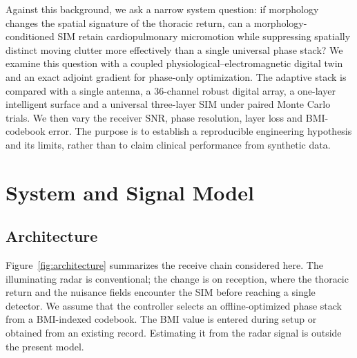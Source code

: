 \documentclass[pdflatex,sn-nature]{sn-jnl}
\begin{document}
Against this background, we ask a narrow system question: if morphology changes the
spatial signature of the thoracic return, can a morphology-conditioned SIM retain
cardiopulmonary micromotion while suppressing spatially distinct moving clutter more
effectively than a single universal phase stack? We examine this question with a
coupled physiological--electromagnetic digital twin and an exact adjoint gradient for
phase-only optimization. The adaptive stack is compared with a single antenna, a
36-channel robust digital array, a one-layer intelligent surface and a universal
three-layer SIM under paired Monte Carlo trials. We then vary the receiver SNR, phase
resolution, layer loss and BMI-codebook error. The purpose is to establish a
reproducible engineering hypothesis and its limits, rather than to claim clinical
performance from synthetic data.

\section{System and Signal Model}

\subsection{Architecture}
Figure~\ref{fig:architecture} summarizes the receive chain considered here. The
illuminating radar is conventional; the change is on reception, where the thoracic
return and the nuisance fields encounter the SIM before reaching a single detector.
We assume that the controller selects an offline-optimized phase stack from a
BMI-indexed codebook. The BMI value is entered during setup or obtained from an
existing record. Estimating it from the radar signal is outside the present model.
\end{document}
